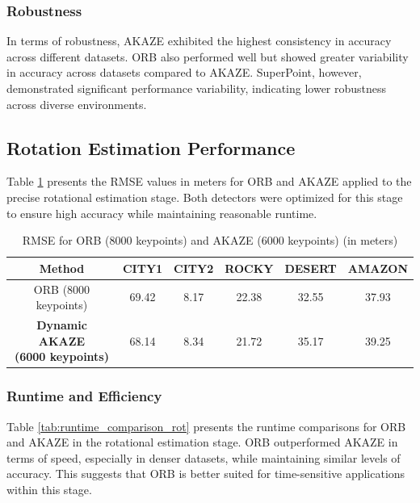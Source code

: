 \subsubsection*{Robustness}

In terms of robustness, AKAZE exhibited the highest consistency in accuracy across different datasets. ORB also performed well but showed greater variability in accuracy across datasets compared to AKAZE. SuperPoint, however, demonstrated significant performance variability, indicating lower robustness across diverse environments.

\subsection{Rotation Estimation Performance}

Table \ref{tab:rmse_rot_comparison} presents the RMSE values in meters for ORB and AKAZE applied to the precise rotational estimation stage. Both detectors were optimized for this stage to ensure high accuracy while maintaining reasonable runtime.

\begin{table}[H]
    \centering
    \caption{RMSE for ORB (8000 keypoints) and AKAZE (6000 keypoints) (in meters)}
    \label{tab:rmse_rot_comparison}
    \begin{tabular}{|c|c|c|c|c|c|}
    \hline
    \textbf{Method} & \textbf{CITY1} & \textbf{CITY2} & \textbf{ROCKY} & \textbf{DESERT} & \textbf{AMAZON} \\ \hline
    ORB (8000 keypoints) & 69.42 & 8.17 & 22.38 & 32.55 & 37.93 \\ \hline
    \makecell{\textbf{Dynamic AKAZE} \\ \textbf{(6000 keypoints)}} & 68.14 & 8.34 & 21.72 & 35.17 & 39.25 \\ \hline
    \end{tabular}
\end{table}

\subsubsection*{Runtime and Efficiency}

Table \ref{tab:runtime_comparison_rot} presents the runtime comparisons for ORB and AKAZE in the rotational estimation stage. ORB outperformed AKAZE in terms of speed, especially in denser datasets, while maintaining similar levels of accuracy. This suggests that ORB is better suited for time-sensitive applications within this stage.

